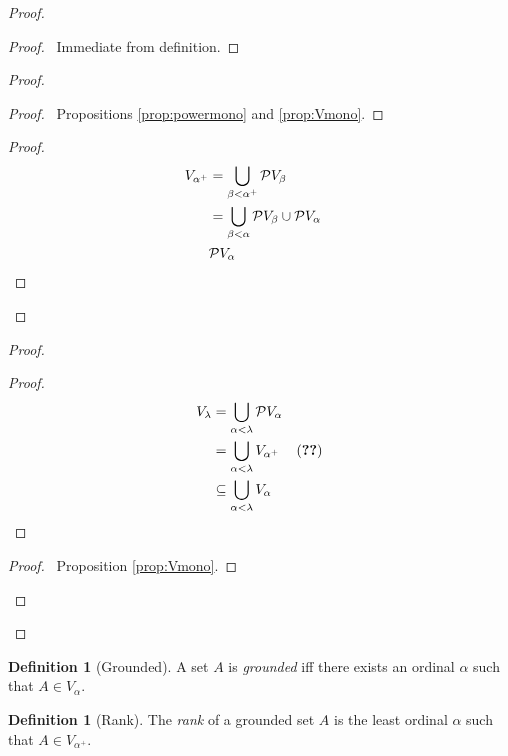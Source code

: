 \documentclass{book}
\let\qed\relax
\theoremstyle{definition}
\newtheorem{df}[ax]{Definition}
\begin{document}
\begin{proof}
\pf
{}
\begin{proof}
	\pf\ Immediate from definition.
\end{proof}
\begin{proof}
	\pf
	\begin{proof}
		\pf\ Propositions \ref{prop:powermono} and \ref{prop:Vmono}.
	\end{proof}
	\begin{proof}
	\begin{align*}
		V_{\alpha^+} & = \bigcup_{\beta < \alpha^+} \mathcal{P} V_\beta \\
		& = \bigcup_{\beta < \alpha} \mathcal{P} V_\beta \cup \mathcal{P} V_\alpha \\
		& \mathcal{P} V_\alpha & \qed
	\end{align*}
	\end{proof}
\end{proof}
\begin{proof}
	\pf
	\begin{proof}
	\pf
	\begin{align*}
		V_\lambda & = \bigcup_{\alpha < \lambda} \mathcal{P} V_\alpha \\
		& = \bigcup_{\alpha < \lambda} V_{\alpha^+} & (\text{\stepref{2}}) \\
		& \subseteq \bigcup_{\alpha < \lambda} V_\alpha
	\end{align*}
	\end{proof}
	\begin{proof}
		\pf\ Proposition \ref{prop:Vmono}.
	\end{proof}
\end{proof}
\qed
\end{proof}

\begin{df}[Grounded]
A set $A$ is \emph{grounded} iff there exists an ordinal $\alpha$ such that $A \in V_\alpha$.
\end{df}

\begin{df}[Rank]
The \emph{rank} of a grounded set $A$ is the least ordinal $\alpha$ such that $A \in V_{\alpha^+}$.
\end{df}
\end{document}
